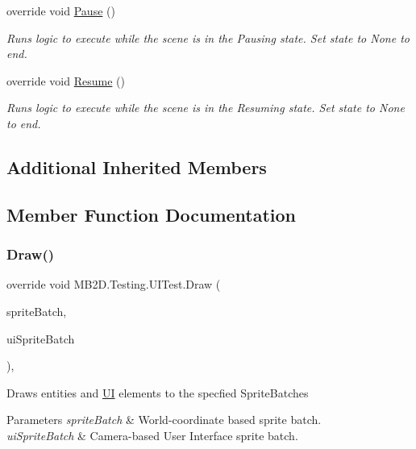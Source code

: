 \begin{DoxyCompactItemize}
override void \hyperlink{class_m_b2_d_1_1_testing_1_1_u_i_test_ae829ddfd489047674efb3131d360901a}{Pause} ()
\begin{DoxyCompactList}\small\item\em Runs logic to execute while the scene is in the Pausing state. Set state to None to end. \end{DoxyCompactList}\item 
override void \hyperlink{class_m_b2_d_1_1_testing_1_1_u_i_test_a933c2bf347db47bf2921709c10d78acc}{Resume} ()
\begin{DoxyCompactList}\small\item\em Runs logic to execute while the scene is in the Resuming state. Set state to None to end. \end{DoxyCompactList}\end{DoxyCompactItemize}
\subsection*{Additional Inherited Members}


\subsection{Member Function Documentation}
\hypertarget{class_m_b2_d_1_1_testing_1_1_u_i_test_a9656d2d62517288a7b4387dafe741ea0}{}\label{class_m_b2_d_1_1_testing_1_1_u_i_test_a9656d2d62517288a7b4387dafe741ea0} 
\subsubsection{\texorpdfstring{Draw()}{Draw()}}
{\footnotesize\ttfamily override void M\+B2\+D.\+Testing.\+U\+I\+Test.\+Draw (\begin{DoxyParamCaption}\item[{Sprite\+Batch}]{sprite\+Batch,  }\item[{Sprite\+Batch}]{ui\+Sprite\+Batch }\end{DoxyParamCaption})\hspace{0.3cm}{\ttfamily [inline]}, {\ttfamily [virtual]}}



Draws entities and \hyperlink{namespace_m_b2_d_1_1_u_i}{UI} elements to the specfied Sprite\+Batches 


\begin{DoxyParams}{Parameters}
{\em sprite\+Batch} & World-\/coordinate based sprite batch.\\
\hline
{\em ui\+Sprite\+Batch} & Camera-\/based User Interface sprite batch.\\
\hline
\end{DoxyParams}


